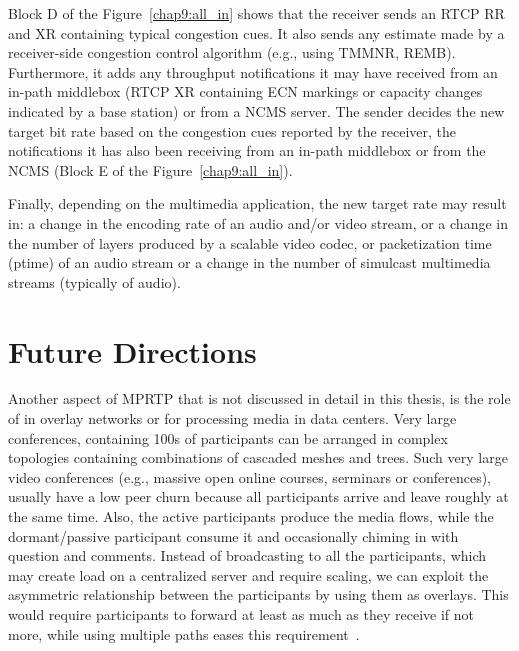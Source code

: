 Block D of the Figure~\ref{chap9:all_in} shows that the receiver sends an RTCP
RR and XR containing typical congestion cues. It also sends any estimate made
by a receiver-side congestion control algorithm (e.g., using TMMNR, REMB).
Furthermore, it adds any throughput notifications it may have received from an
in-path middlebox (RTCP XR containing ECN markings or capacity changes
indicated by a base station) or from a NCMS server. The sender decides the new
target bit rate based on the congestion cues reported by the receiver, the
notifications it has also been receiving from an in-path middlebox or from the
NCMS (Block E of the Figure~\ref{chap9:all_in}).


Finally, depending on the multimedia application, the new target rate may
result in: a change in the encoding rate of an audio and/or video stream, or a
change in the number of layers produced by a scalable video codec, or
packetization time (ptime) of an audio stream or a change in the number of
simulcast multimedia streams (typically of audio).

\section{Future Directions}

Another aspect of MPRTP that is not discussed in detail in this thesis, is the
role of in overlay networks or for processing media in data centers. Very
large conferences, containing 100s of participants can be arranged in complex
topologies containing combinations of cascaded meshes and trees. Such very
large video conferences (e.g., massive open online courses, serminars or
conferences), usually have a low peer churn because all participants arrive
and leave roughly at the same time. Also, the active participants produce the
media flows, while the dormant/passive participant consume it and occasionally
chiming in with question and comments. Instead of broadcasting to all the
participants, which may create load on a centralized server and require
scaling, we can exploit the asymmetric relationship between the participants
by using them as overlays. This would require participants to forward at least
as much as they receive if not more, while using multiple paths eases this
requirement~\cite{Noh2008,Li2010a,Globisch:AsymGrpComm}.



